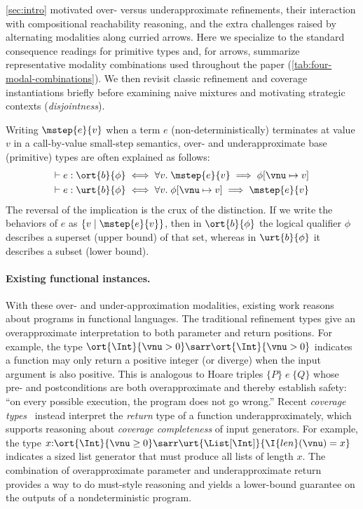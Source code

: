 \autoref{sec:intro} motivated over- versus underapproximate refinements, their
interaction with compositional reachability reasoning, and the extra challenges
raised by alternating modalities along curried arrows.
Here we specialize to the standard consequence readings for primitive types and,
for arrows, summarize representative modality combinations used throughout the
paper (\autoref{tab:four-modal-combinations}).
We then revisit classic refinement and coverage instantiations briefly before
examining naive mixtures and motivating strategic contexts (\emph{disjointness}).

Writing $\mstep{e}{v}$ when a term $e$ (non-deterministically) terminates at value $v$
in a call-by-value small-step semantics, over- and underapproximate base (primitive) types are often explained as follows:
\begin{align*}
    \vdash e : \ort{b}{\phi} &\iff \forall v.\; \mstep{e}{v} \implies \phi[\vnu \mapsto v]
    \\\vdash e : \urt{b}{\phi} &\iff \forall v.\; \phi[\vnu \mapsto v] \implies \mstep{e}{v}
\end{align*}
The reversal of the implication is the crux of the distinction.
If we write the behaviors of $e$ as $\{v \mid \mstep{e}{v}\}$, then in
$\ort{b}{\phi}$ the logical qualifier $\phi$ describes a superset (upper bound) of
that set, whereas in $\urt{b}{\phi}$ it describes a subset (lower bound).

\paragraph{Existing functional instances.}
With these over- and under-approximation modalities, existing work reasons about programs in functional languages.
The traditional refinement types give an overapproximate interpretation to both parameter and return positions. For example, the type $\ort{\Int}{\vnu > 0} \sarr \ort{\Int}{\vnu > 0}$ indicates a function may only return a positive integer (or diverge) when the input argument is also positive. This is analogous to Hoare triples $\{P\}\;e \;\{Q\}$ whose pre- and postconditions are both overapproximate and thereby establish safety:
``on every possible execution, the program does not go wrong.''
Recent \emph{coverage types}~\cite{CoverageType} instead interpret the
\emph{return} type of a function underapproximately, which supports reasoning about
\emph{coverage completeness} of input generators. For example, the type $x{:}\ort{\Int}{\vnu \geq 0} \sarr \urt{\List[\Int]}{\I{len}(\vnu) = x}$ indicates a sized list generator that must produce all lists of length $x$. 
The combination of overapproximate parameter and underapproximate return provides a way to do must-style reasoning and yields a lower-bound guarantee on the outputs of a nondeterministic program.


